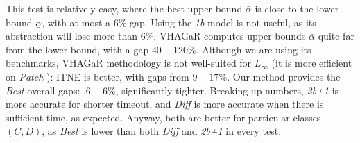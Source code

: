 \fi





\smallskip 

 This test is relatively easy, where the best upper bound $\bar{\alpha}$ is close to the lower bound $\underline{\alpha}$, with at most a $6\%$ gap. Using the {\em 1b} model is not useful, as its abstraction will lose more than $6\%$. 
VHAGaR computes upper bounds $\bar{\alpha}$ quite far from the lower bound, with a gap $40-120\%$. Although we are using its benchmarks, VHAGaR methodology is not well-suited for $L_\infty$ (it is more efficient on {\em Patch} \cite{vhagar}): ITNE is better, with gaps from $9-17\%$.
Our method provides the {\em Best} overall gaps: $.6-6\%$, significantly tighter. Breaking up numbers, {\em 2b+1} is more accurate for shorter timeout, and {\em Diff} is more accurate when there is sufficient time, as expected. 
Anyway, both are better for particular classes $(C,D)$, as {\em Best} is lower than both {\em Diff} and {\em 2b+1} in every test.








%		
%		
%		
%		
%		
%		
%		
%		



